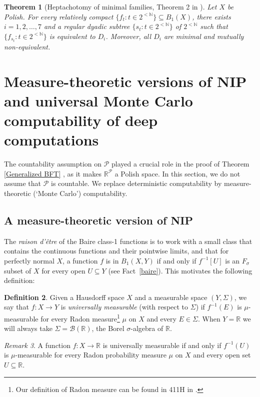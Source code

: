 \documentclass[psamsfonts]{amsart}
\newtheorem{thm}{Theorem}[section]
\theoremstyle{definition}
\newtheorem{defn}[thm]{Definition}
\theoremstyle{remark}
\newtheorem{rem}[thm]{Remark}
\numberwithin{equation}{section}
\begin{document}
\begin{thm}[Heptachotomy of minimal families, Theorem 2 in \cite{argyros2008rosenthal}]
    Let $X$ be Polish.
For every relatively compact $\{f_{t}:t\in 2^{<\mathbb{N}}\}\subseteq B_1(X)$, there exists $i=1,2,\dots, 7$ and a regular dyadic subtree $\{s_t:t\in 2^{<\mathbb{N}}\}$ of $2^{<\mathbb{N}}$ such that $\{f_{s_t}:t\in 2^{<\mathbb{N}}\}$ is equivalent to $D_i$.
Moreover, all $D_i$ are minimal and mutually non-equivalent.
\end{thm}

\section{Measure-theoretic versions of NIP and universal Monte Carlo computability of  deep computations}
\label{Measure-theoretic NIP}

The countability assumption on $\mathcal{P}$  played a crucial  role in the proof of Theorem \ref{Generalized BFT} , as it makes $\mathbb{R}^\mathcal{P}$ a Polish space.
In this section, we do not assume that $\mathcal{P}$ is countable.
We replace deterministic computability by measure-theoretic (`Monte Carlo') computability.

\subsection{A measure-theoretic version of NIP}

The \emph{raison d'être} of the Baire class-1 functions is to work with a small class that contains the continuous functions and their pointwise limits, and that for perfectly normal $X$, a function  $f$ is in $B_1(X,Y)$ if and only if $f^{-1}[U]$ is an $F_\sigma$ subset of $X$ for every open $U\subseteq Y$ (see Fact~\ref{baire}).
This motivates the following definition:


\begin{defn}
\label{D:universal measurability}
Given a Hausdorff space $X$ and a measurable space $(Y,\Sigma)$, we say that $f:X\rightarrow Y$ is \emph{universally measurable} (with respect to $\Sigma$) if $f^{-1}(E)$ is $\mu$-measurable for every Radon measure\footnote{Our definition of Radon measure can be found in 411H in \cite{fremlin2003vol4}.
} $\mu$ on $X$ and every $E\in\Sigma$.
When $Y=\mathbb{R}$ we will always take $\Sigma=\mathcal{B}(\mathbb{R})$, the Borel $\sigma$-algebra of $\mathbb{R}$.
\end{defn}

\begin{rem} 
A function $f:X\rightarrow\mathbb{R}$ is universally measurable if and only if $f^{-1}(U)$ is $\mu$-measurable for every Radon probability measure $\mu$ on $X$ and every open set $U\subseteq\mathbb{R}$.

\end{rem}
\end{document}
